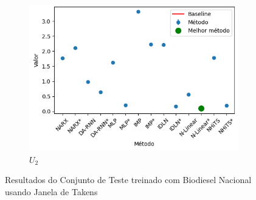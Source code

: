 \begin{figure}[htbp]
\begin{subfigure}[b]{0.3\textwidth}
		\includegraphics[width=\textwidth]{figuras/u2_takens_brasil_results_test.png}
		\caption{\(U_2\)}
		\label{fig:u2_takens_brasil_results_test}
	\end{subfigure}
	\caption{Resultados do Conjunto de Teste treinado com Biodiesel Nacional usando Janela de Takens}
	\label{fig:takens_brasil_results_test}
\end{figure}
